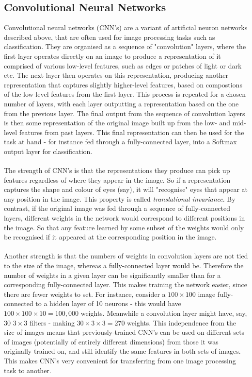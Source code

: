 \documentclass[11pt]{article} %
\theoremstyle{plain}
\theoremstyle{definition}
\begin{document}
\newpage
\subsection{Convolutional Neural Networks}
Convolutional neural networks (CNN's) are a variant of artificial neuron networks described above, that are often used for image processing tasks such as classification. They are organised as a sequence of "convolution" layers, where the first layer operates directly on an image to produce a representation of it comprised of various low-level features, such as edges or patches of light or dark etc. The next layer then operates on this representation, producing another representation that captures slightly higher-level features, based on compostions of the low-level features from the first layer. This process is repeated for a chosen number of layers, with each layer outputting a representation based on the one from the previous layer. The final output from the sequence of convolution layers is then some representation of the original image built up from the low- and mid-level features from past layers. This final representation can then be used for the task at hand - for instance fed through a fully-connected layer, into a Softmax output layer for classification.     
\\
\\
\noindent
The strength of CNN's is that the representations they produce can pick up features regardless of where they appear in the image. So if a representation captures the shape and colour of eyes (say), it will "recognise" eyes that appear at any position in the image. This property is called \textit{translational invariance}. By contrast, if the original image was fed through a sequence of fully-connected layers, different weights in the network would correspond to different positions in the image. So that any feature learned by some subset of the weights would only be recognised if it appeared at the corresponding position in the image.
\\
\\
\noindent
Another strength is that the numbers of weights in convolution layers are not tied to the size of the image, whereas a fully-connected layer would be. Therefore the number of weights in a given layer can be significantly smaller than for a corresponding fully-connected layer. This makes training the network easier, since there are fewer weights to set. For instance, consider a \(100 \times 100\) image fully-connected to a hidden layer of 10 neurons - this would have \(100 \times 100 \times 10 = 100,000\) weights. Meanwhile a convolution layer might have, say, 30 \(3 \times 3\) filters - making \(30 \times 3 \times 3 = 270\) weights. This independence from the size of images means that previously-trained CNN's can be used on different sets of images (potentially of entirely different dimensions) from those it was originally trained on, and still identify the same features in both sets of images. This makes CNN's very convenient for transferring from one image processing task to another. 
\end{document}
